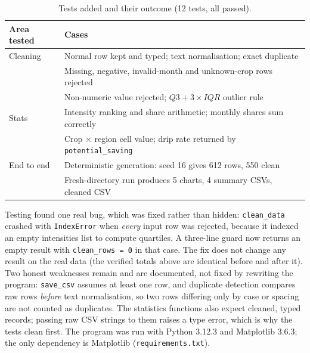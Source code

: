 \documentclass[11pt,a4paper]{article}
\begin{document}
\begin{table}[h]
\centering\small
\caption{Tests added and their outcome (12 tests, all passed).}
\label{tab:tests}
\begin{tabular}{ll}
\toprule
Area tested & Cases \\
\midrule
Cleaning & Normal row kept and typed; text normalisation; exact duplicate \\
         & Missing, negative, invalid-month and unknown-crop rows rejected \\
         & Non-numeric value rejected; $Q3+3\times IQR$ outlier rule \\
Stats & Intensity ranking and share arithmetic; monthly shares sum correctly \\
      & Crop $\times$ region cell value; drip rate returned by
        \texttt{potential\_saving} \\
End to end & Deterministic generation: seed 16 gives 612 rows, 550 clean \\
           & Fresh-directory run produces 5 charts, 4 summary CSVs, cleaned CSV \\
\bottomrule
\end{tabular}
\end{table}

Testing found one real bug, which was fixed rather than hidden: \texttt{clean\_data}
crashed with \texttt{IndexError} when \emph{every} input row was rejected, because it
indexed an empty intensities list to compute quartiles. A three-line guard now returns
an empty result with \texttt{clean\_rows = 0} in that case. The fix does not change any
result on the real data (the verified totals above are identical before and after it).
Two honest weaknesses remain and are documented, not fixed by rewriting the program:
\texttt{save\_csv} assumes at least one row, and duplicate detection compares raw rows
\emph{before} text normalisation, so two rows differing only by case or spacing are
not counted as duplicates. The statistics functions also expect cleaned, typed records;
passing raw CSV strings to them raises a type error, which is why the tests clean
first. The program was run with Python 3.12.3 and Matplotlib 3.6.3; the only dependency
is Matplotlib (\texttt{requirements.txt}).
\end{document}
